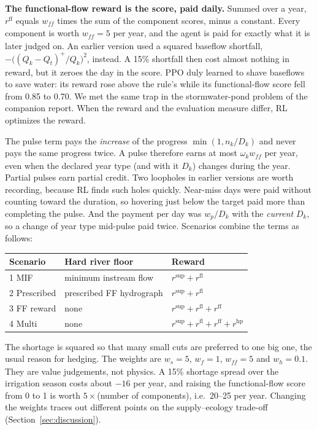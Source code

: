 \documentclass[11pt]{article}
\begin{document}
\textbf{The functional-flow reward is the score, paid daily.} Summed over a
year, $r^{\mathrm{ff}}$ equals $w_{\mathit{ff}}$ times the sum of the
component scores, minus a constant. Every component is worth
$w_{\mathit{ff}}=5$ per year, and the agent is paid for exactly what it is
later judged on. An earlier version used a squared baseflow shortfall,
$-\big((Q_k-Q_t)^+/Q_k\big)^2$, instead. A 15\% shortfall then cost almost
nothing in reward, but it zeroes the day in the score. PPO duly learned to
shave baseflows to save water: its reward rose above the rule's while its
functional-flow score fell from 0.85 to 0.70. We met the same trap in the
stormwater-pond problem of the companion report. When the reward and the
evaluation measure differ, RL optimizes the reward.

The pulse term pays the \emph{increase} of the progress $\min(1,n_k/D_k)$
and never pays the same progress twice. A pulse therefore earns at most
$\omega_k w_{\mathit{ff}}$ per year, even when the declared year type
(and with it $D_k$) changes during the year. Partial pulses earn partial
credit. Two loopholes in earlier versions are worth recording, because RL
finds such holes quickly. Near-miss days were paid without counting
toward the duration, so hovering just below the target paid more than
completing the pulse. And the payment per day was $w_p/D_k$ with the
\emph{current} $D_k$, so a change of year type mid-pulse paid twice.
Scenarios combine the terms as follows:
\begin{center}\small
\begin{tabular}{@{}lll@{}}
\toprule
Scenario & Hard river floor & Reward\\
\midrule
1 MIF & minimum instream flow & $r^{\mathrm{sup}}+r^{\mathrm{fl}}$\\
2 Prescribed & prescribed FF hydrograph & $r^{\mathrm{sup}}+r^{\mathrm{fl}}$\\
3 FF reward & none & $r^{\mathrm{sup}}+r^{\mathrm{fl}}+r^{\mathrm{ff}}$\\
4 Multi & none & $r^{\mathrm{sup}}+r^{\mathrm{fl}}+r^{\mathrm{ff}}+r^{\mathrm{hp}}$\\
\bottomrule
\end{tabular}
\end{center}
The shortage is squared so that many small cuts are preferred to one big
one, the usual reason for hedging. The weights are $w_s=5$, $w_f=1$, $w_{\mathit{ff}}=5$ and $w_h=0.1$.
They are value judgements, not physics. A 15\% shortage spread over the
irrigation season costs about $-16$ per year, and raising the
functional-flow score from 0 to 1 is worth $5\times$(number of components),
i.e.\ 20--25 per year. Changing the weights traces out different points on the
supply--ecology trade-off (Section~\ref{sec:discussion}).
\end{document}
